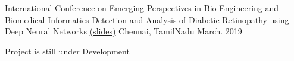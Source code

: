 

\begin{cventries}
 
  \cventry
    {\href{https://icbbi2019.in/}{International Conference on Emerging Perspectives in Bio-Engineering and Biomedical Informatics}} %
    {Detection and Analysis of Diabetic Retinopathy using Deep Neural Networks \href{https://drive.google.com/file/d/1RLwP3uvLaMLP-GJNnn8GCFhVJtVshnDl/view?usp=sharing}{(slides)}} %
    {Chennai, TamilNadu} %
    {March. 2019} %
    {
      \begin{cvitems} %
        \item {Project is still under Development}
      \end{cvitems}
    }

\end{cventries}

